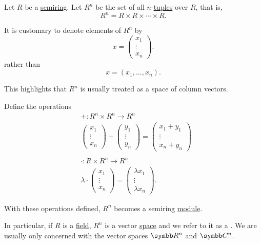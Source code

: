 \begin{definition}\label{def:left_module_of_tuples}
  Let \( R \) be a \hyperref[def:semiring]{semiring}. Let \( R^n \) be the set of all \( n \)-\hyperref[def:array/vector]{tuples} over \( R \), that is,
  \begin{equation*}
    R^n = R \times R \times \cdots \times R.
  \end{equation*}

  It is customary to denote elements of \( R^n \) by
  \begin{equation*}
    x = \begin{pmatrix} x_1 \\ \vdots \\ x_n \end{pmatrix}.
  \end{equation*}
  rather than
  \begin{equation*}
    x = (x_1, \ldots, x_n).
  \end{equation*}

  This highlights that \( R^n \) is usually treated as a space of column vectors.

  Define the operations
  \begin{align*}
    &+: R^n \times R^n \to R^n
    \\
    &\begin{pmatrix} x_1 \\ \vdots \\ x_n \end{pmatrix}
    +
    \begin{pmatrix} y_1 \\ \vdots \\ y_n \end{pmatrix}
    =
    \begin{pmatrix} x_1 + y_1 \\ \vdots \\ x_n + y_n \end{pmatrix}
    \\
    \\
    &\cdot: R \times R^n \to R^n
    \\
    &\lambda \cdot \begin{pmatrix} x_1 \\ \vdots \\ x_n \end{pmatrix}
    =
    \begin{pmatrix} \lambda x_1 \\ \vdots \\ \lambda x_n \end{pmatrix}.
  \end{align*}

  With these operations defined, \( R^n \) becomes a semiring \hyperref[def:left_module]{module}.

  In particular, if \( R \) is a \hyperref[def:semiring/field]{field}, \( R^n \) is a vector \hyperref[def:vector_space]{space} and we refer to it as a . We are usually only concerned with the vector spaces \( \BR^n \) and \( \BC^n \).
\end{definition}

